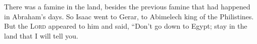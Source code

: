 
\begin{inparaenum}
     There was a famine in the land, besides the previous famine that had happened in Abraham's days. So Isaac went to Gerar, to Abimelech king of the Philistines.%
     But the \textsc{Lord} appeared to him and said, ``Don't go down to Egypt; stay in the land that I will tell you.%
    
\end{inparaenum}
